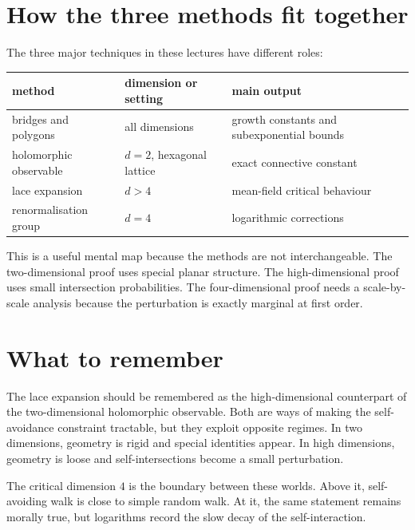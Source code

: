 \section{How the three methods fit together}

The three major techniques in these lectures have different roles:
\begin{center}
\small
\begin{tabular}{>{\raggedright\arraybackslash}p{}>{\raggedright\arraybackslash}p{}>{\raggedright\arraybackslash}p{}}
\toprule
method & dimension or setting & main output\\
\midrule
bridges and polygons & all dimensions & growth constants and subexponential bounds\\
holomorphic observable & \(d=2\), hexagonal lattice & exact connective constant\\
lace expansion & \(d>4\) & mean-field critical behaviour\\
renormalisation group & \(d=4\) & logarithmic corrections\\
\bottomrule
\end{tabular}
\end{center}
This is a useful mental map because the methods are not interchangeable.  The two-dimensional proof uses special planar structure.  The high-dimensional proof uses small intersection probabilities.  The four-dimensional proof needs a scale-by-scale analysis because the perturbation is exactly marginal at first order.

\section{What to remember}

The lace expansion should be remembered as the high-dimensional counterpart of the two-dimensional holomorphic observable.  Both are ways of making the self-avoidance constraint tractable, but they exploit opposite regimes.  In two dimensions, geometry is rigid and special identities appear.  In high dimensions, geometry is loose and self-intersections become a small perturbation.

The critical dimension \(4\) is the boundary between these worlds.  Above it, self-avoiding walk is close to simple random walk.  At it, the same statement remains morally true, but logarithms record the slow decay of the self-interaction.
